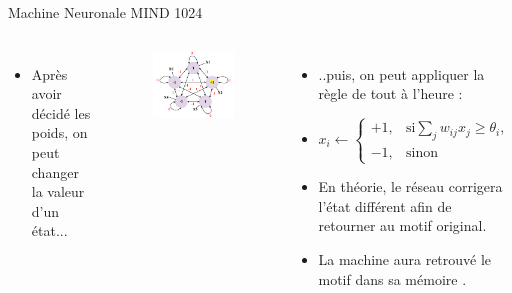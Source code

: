 \documentclass{beamer}
\begin{document}
\begin{frame}{Machine Neuronale MIND 1024}
    \begin{columns}[T]
            \begin{itemize}[<+-| alert@+>] %
                \item Après avoir décidé les poids, on peut changer la valeur d'un état...
            \end{itemize}
            \begin{figure}
                \centering
                \includegraphics[width=1.25\linewidth]{pic/network3.png}
            \end{figure}
            \begin{itemize}[<+-| alert@+>] %
                \item ..puis, on peut appliquer la règle de tout à l'heure :
                \item $
                        x_i \leftarrow
                        \begin{cases}
                        +1,& \text{si} \sum_j w_{ij} x_j \geq \theta_i,\\
                        -1,& \text{sinon}
                        \end{cases}
                    $
                \item En théorie, le réseau corrigera l'état différent afin de retourner au motif original.
                \item La machine aura retrouvé le motif \og dans sa mémoire \fg{}.
            \end{itemize}
    \end{columns}
\end{frame}
\end{document}

